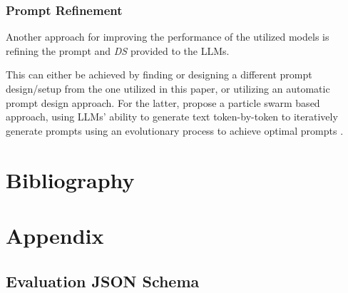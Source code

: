 \documentclass[bs, english]{stthesis}
\begin{document}
\subsection{Prompt Refinement}

Another approach for improving the performance of the utilized models is refining the prompt and \textit{DS} provided to the LLMs.

This can either be achieved by finding or designing a different prompt design/setup from the one utilized in this paper, or utilizing an automatic prompt design approach. For the latter, \citeauthor{zhangAutomaticPromptDesign2025} propose a particle swarm based approach, using LLMs' ability to generate text token-by-token to iteratively generate prompts using an evolutionary process to achieve optimal prompts \cite{zhangAutomaticPromptDesign2025}.


\backmatter
\chapter{Bibliography}
\printbibliography[heading=none]
\appendix
\chapter{Appendix}

\section{Evaluation JSON Schema}
\end{document}
